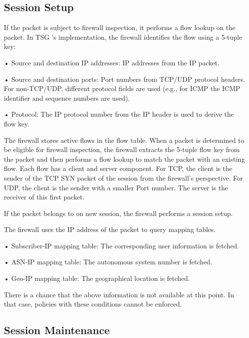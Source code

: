 \subsection*{\hypertarget{link:Session Setup}{Session Setup}}
\label{sec:appendix_e:sequence:setup}

If the packet is subject to firewall inspection, it performs a flow lookup on the packet. In TSG ’s implementation, the firewall identifies the flow using a 5-tuple key:


• Source and destination IP addresses: IP addresses from the IP packet. 


• Source and destination ports: Port numbers from TCP/UDP protocol headers. For non-TCP/UDP, different protocol fields are used (e.g., for ICMP the ICMP identifier and sequence numbers are used).


• Protocol: The IP protocol number from the IP header is used to derive the flow key. 


The firewall stores active flows in the flow table. When a packet is determined to be eligible for firewall inspection, 
the firewall extracts the 5-tuple flow key from the packet and then performs a flow lookup to match the packet with an existing flow. 
Each flow has a client and server component. For TCP, the client is the sender of the TCP SYN packet of the session from the firewall’s perspective. 
For UDP, the client is the sender with a smaller Port number. The server is the receiver of this first packet. 


If the packet belongs to on new session, the firewall performs a session setup.


The firewall uses the IP address of the packet to query mapping tables.


• Subscriber-IP mapping table: The corresponding user information is fetched.


• ASN-IP mapping table: The autonomous system number is fetched.


• Geo-IP mapping table: The geographical location is fetched.


There is a chance that the above information is not available at this point. In that case, policies with these conditions cannot be enforced.

\subsection*{\hypertarget{link:Session Maintenance}{Session Maintenance}}
\label{sec:appendix_e:sequence:maintenance}

